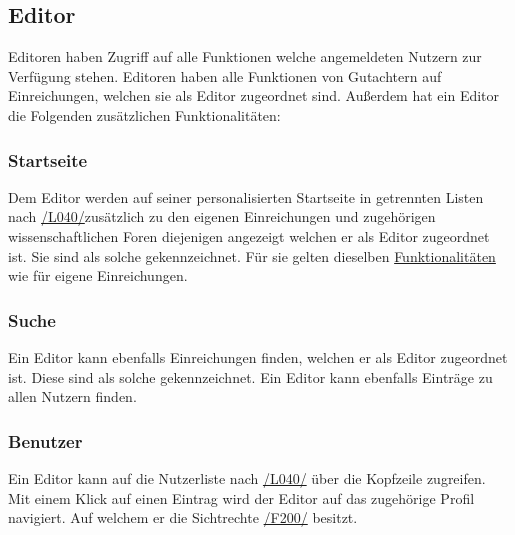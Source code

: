 \subsection{Editor}\label{funkt:editor}
Editoren haben Zugriff auf alle Funktionen welche angemeldeten Nutzern zur Verfügung stehen.
Editoren haben alle Funktionen von Gutachtern auf Einreichungen, welchen sie als Editor zugeordnet sind.
Außerdem hat ein Editor die Folgenden zusätzlichen Funktionalitäten:

\subsubsection{Startseite}
\begin{description}
     Dem Editor werden auf seiner personalisierten Startseite in getrennten Listen nach \hyperref[leist:040]{/L040/}zusätzlich zu den eigenen
    Einreichungen und zugehörigen wissenschaftlichen Foren diejenigen angezeigt welchen er als Editor zugeordnet ist.
    Sie sind als solche gekennzeichnet. Für sie gelten dieselben \hyperref[nut:start]{Funktionalitäten} wie für eigene Einreichungen.
\end{description}

\subsubsection{Suche} \label{ed:suche}
\begin{description}
     Ein Editor kann ebenfalls Einreichungen finden, welchen er als Editor zugeordnet ist.
    Diese sind als solche gekennzeichnet.
     Ein Editor kann ebenfalls Einträge zu allen Nutzern finden.
\end{description}

\subsubsection{Benutzer} \label{ed:benutzer}
\begin{description}
     Ein Editor kann auf die Nutzerliste nach \hyperref[leist:40]{/L040/} über die Kopfzeile zugreifen.
     Mit einem Klick auf einen Eintrag wird der Editor auf das zugehörige Profil navigiert.
    Auf welchem er die Sichtrechte \hyperref[funkt:200]{/F200/} besitzt.
\end{description}

